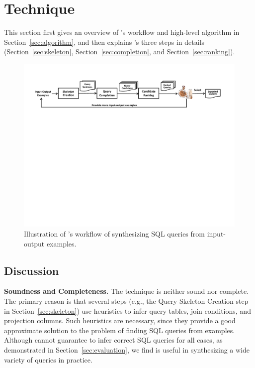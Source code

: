 
\section{Technique}
\label{sec:approach}

This section first gives an overview of \ourtool's
workflow and high-level algorithm in Section~\ref{sec:algorithm}, and
then explains \ourtool's three steps in details (Section~\ref{sec:skeleton},
Section~\ref{sec:completion}, and Section~\ref{sec:ranking}).



\begin{figure}[t]
  \centering
  \includegraphics[scale=0.70]{workflow}
  \vspace*{-2.0ex}\caption {{\label{fig:workflow} Illustration
  of \ourtool's workflow of synthesizing SQL queries from input-output examples. 
}}

\end{figure}













\subsection{Discussion}
\label{sec:uim}


\noindent \textbf{Soundness and Completeness.} The \ourtool
technique is neither sound nor complete. The primary
reason is that several steps (e.g., the Query Skeleton Creation
step in Section~\ref{sec:skeleton}) use heuristics
to infer query tables, join conditions, and projection columns.
Such heuristics are necessary, since they provide a
good approximate solution to the problem of finding SQL queries
from examples. %
Although \ourtool cannot guarantee to infer correct SQL queries
for all cases, as demonstrated in Section~\ref{sec:evaluation},
we find \ourtool
is useful in synthesizing a wide variety of queries in practice.


